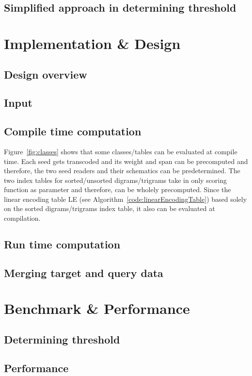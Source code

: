 \documentclass[11pt,a4paper]{scrartcl}
\begin{document}
\subsection{Simplified approach in determining threshold}

\section{Implementation \& Design}
\subsection{Design overview}

\subsection{Input}

\subsection{Compile time computation}
Figure~\ref{fig:classes} shows that some classes/tables can be evaluated at compile time. Each seed gets transcoded and its weight and span can be precomputed and therefore, the two seed readers and their schematics can be predetermined. The two index tables for sorted/unsorted digrams/trigrams take in only scoring function as parameter and therefore, can be wholely precomputed. Since the linear encoding table LE (see Algorithm~\ref{code:linearEncodingTable}) based solely on the sorted digrams/trigrams index table, it also can be evaluated at compilation.
\subsection{Run time computation}


\subsection{Merging target and query data}

\section{Benchmark \& Performance}
\subsection{Determining threshold}
\subsection{Performance}
\end{document}
